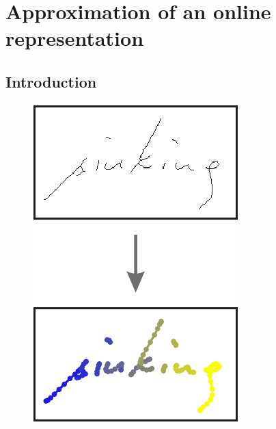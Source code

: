 \chapter{Approximation of an online representation}\label{chapter:resampling}


\section{Introduction}

\begin{figure}
  \vspace{-15pt}
  \raggedleft
  \begin{minipage}{0.20\textwidth}
    \centering
    \includegraphics[width=\textwidth]{../assets/showcase/pipeline_resampling.pdf}
    \caption[Approximation of an online representation]{}
    \vspace{-45pt}
    \label{fig:resamplingStage}
  \end{minipage}%
\end{figure}

